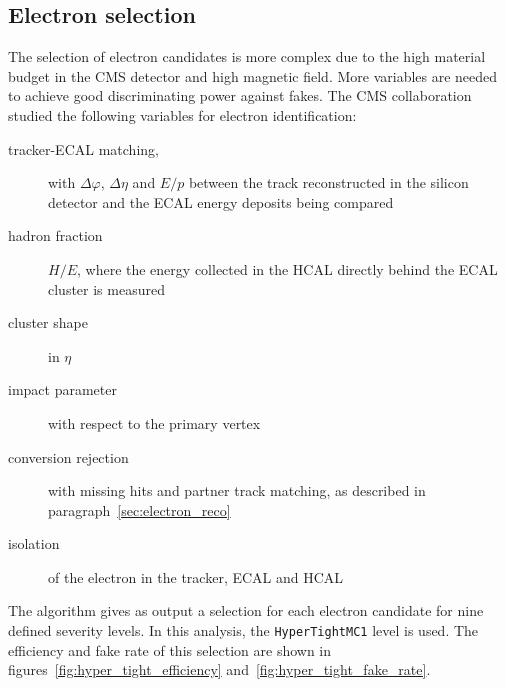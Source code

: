 \subsection{Electron selection}\label{sec:electron_selection}
The selection of electron candidates is more complex due to the high
material budget in the CMS detector and high magnetic field. More variables are
needed to achieve good discriminating power against fakes.
The CMS collaboration studied the following variables for electron
identification:
\begin{description}
    \item[tracker-ECAL matching,] with $\Delta \varphi$, $\Delta \eta$ and
        $E/p$ between the track reconstructed in the silicon detector and
        the ECAL energy deposits being compared
    \item[hadron fraction] $H/E$, where the energy collected in the HCAL
        directly behind the ECAL cluster is measured
    \item[cluster shape] in $\eta$
    \item[impact parameter]  with respect to the primary vertex
    \item[conversion rejection] with missing hits and partner track
        matching, as described in paragraph~\ref{sec:electron_reco}
    \item[isolation] of the electron in the tracker, ECAL and HCAL
\end{description}
The algorithm gives as output a selection for each electron candidate for
nine defined severity levels. In this analysis, the \texttt{HyperTightMC1}
level is used. The efficiency and fake rate of this selection are shown in
figures~\ref{fig:hyper_tight_efficiency}
and~\ref{fig:hyper_tight_fake_rate}.


